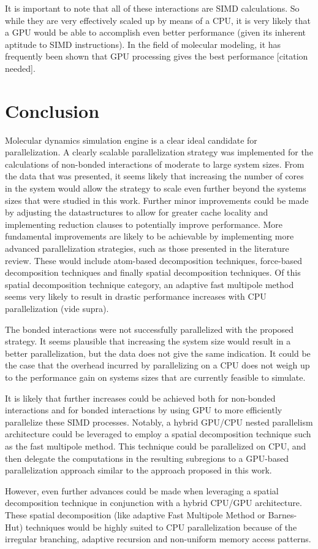\documentclass[conference]{IEEEtran}
\begin{document}
It is important to note that all of these
interactions are SIMD calculations. So while they are very effectively scaled up by means of a CPU, it is very likely
that a GPU would be able to accomplish even better performance (given its inherent aptitude to SIMD instructions). 
In the field of molecular modeling, it has frequently been shown that GPU processing gives the best performance [citation needed].

\section{Conclusion}
Molecular dynamics simulation engine is a clear ideal candidate for parallelization. A clearly scalable
parallelization strategy was implemented for the calculations of non-bonded interactions of moderate to large system 
sizes. From the data that was presented, it seems likely that increasing the number of cores in the system would 
allow the strategy to scale even further beyond the systems sizes that were studied in this work. Further minor improvements
could be made by adjusting the datastructures to allow for greater cache locality and implementing reduction clauses
to potentially improve performance. More fundamental improvements are likely to be achievable by implementing more
advanced parallelization strategies, such as those presented in the literature review. These would include atom-based
decomposition techniques, force-based decomposition techniques and finally spatial decomposition techniques.
Of this spatial decomposition technique category, an adaptive
fast multipole method seems very likely to result in drastic performance increases with CPU parallelization (vide supra).

The bonded
interactions were not successfully parallelized with the proposed strategy. It seems plausible that increasing
the system size would result in a better parallelization, but the data does not give the same indication. It could be 
the case that the overhead incurred by parallelizing on a CPU does not weigh up to the performance gain on 
systems sizes that are currently feasible to simulate.

It is likely
that further increases could be achieved both for non-bonded interactions and for bonded interactions 
by using GPU to more efficiently parallelize these SIMD processes. Notably, a hybrid GPU/CPU 
nested parallelism architecture could be
leveraged to employ a spatial decomposition technique such as the fast multipole method. This technique could be
parallelized on CPU, and then delegate the computations in the resulting subregions to a GPU-based parallelization
approach similar to the approach proposed in this work.


However,
even further advances could be made when leveraging a spatial decomposition technique in conjunction with a hybrid
CPU/GPU architecture. These spatial decomposition (like adaptive Fast Multipole Method or Barnes-Hut) techniques would be 
highly suited to CPU parallelization because of the irregular branching, adaptive recursion and non-uniform memory
access patterns. 





\end{document}
